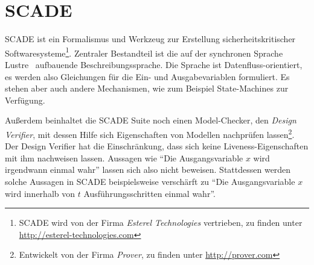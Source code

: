 \section{SCADE}
\label{sec:scade}
SCADE ist ein Formalismus und Werkzeug zur Erstellung sicherheitskritischer Softwaresysteme\footnote{SCADE wird von der Firma \emph{Esterel Technologies} vertrieben, zu finden unter \url{http://esterel-technologies.com}}.
Zentraler Bestandteil ist die auf der synchronen Sprache Lustre~\cite{lustre} aufbauende Beschreibungssprache.
Die Sprache ist Datenfluss-orientiert, es werden also Gleichungen für die Ein- und Ausgabevariablen formuliert.
Es stehen aber auch andere Mechanismen, wie zum Beispiel State-Machines zur Verfügung.

Außerdem beinhaltet die SCADE Suite noch einen Model-Checker, den \emph{Design Verifier}, mit dessen Hilfe sich Eigenschaften von Modellen nachprüfen lassen\footnote{Entwickelt von der Firma \emph{Prover}, zu finden unter \url{http://prover.com}}.
Der Design Verifier hat die Einschränkung, dass sich keine Liveness-Eigenschaften mit ihm nachweisen lassen.
Aussagen wie "`Die Ausgangsvariable $x$ wird irgendwann einmal wahr"' lassen sich also nicht beweisen.
Stattdessen werden solche Aussagen in SCADE beispielsweise verschärft zu "`Die Ausgangsvariable $x$ wird innerhalb von $t$ Ausführungsschritten einmal wahr"'.